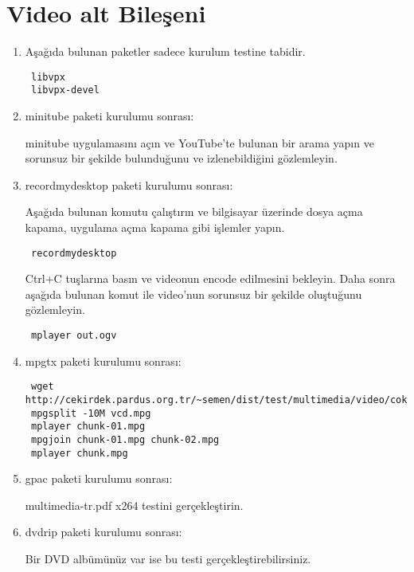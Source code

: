 \documentclass[a4paper,10pt]{article}
\begin{document}
\section{Video alt Bileşeni}
\begin{enumerate}
\item Aşağıda bulunan paketler sadece kurulum testine tabidir. 
\begin{verbatim}
 libvpx
 libvpx-devel
\end{verbatim}

\item minitube paketi kurulumu sonrası:

minitube uygulamasını açın ve YouTube'te bulunan bir arama yapın ve sorunsuz bir şekilde bulunduğunu ve izlenebildiğini gözlemleyin.
\item recordmydesktop paketi kurulumu sonrası:

Aşağıda bulunan komutu çalıştırın ve bilgisayar üzerinde dosya açma kapama, uygulama açma kapama gibi işlemler yapın. 
\begin{verbatim}
 recordmydesktop
\end{verbatim}

Ctrl+C tuşlarına basın ve videonun encode edilmesini bekleyin. Daha sonra aşağıda bulunan komut ile video'nun sorunsuz bir şekilde oluştuğunu gözlemleyin.

\begin{verbatim}
 mplayer out.ogv 
\end{verbatim}

\item mpgtx paketi kurulumu sonrası:

\begin{verbatim}
 wget http://cekirdek.pardus.org.tr/~semen/dist/test/multimedia/video/cokluortam/vcd.mpg
 mpgsplit -10M vcd.mpg
 mplayer chunk-01.mpg
 mpgjoin chunk-01.mpg chunk-02.mpg 
 mplayer chunk.mpg
\end{verbatim}

\item gpac paketi kurulumu sonrası:

multimedia-tr.pdf x264 testini gerçekleştirin.

\item dvdrip paketi kurulumu sonrası:

Bir DVD albümünüz var ise bu testi gerçekleştirebilirsiniz.


\end{enumerate}
\end{document}

